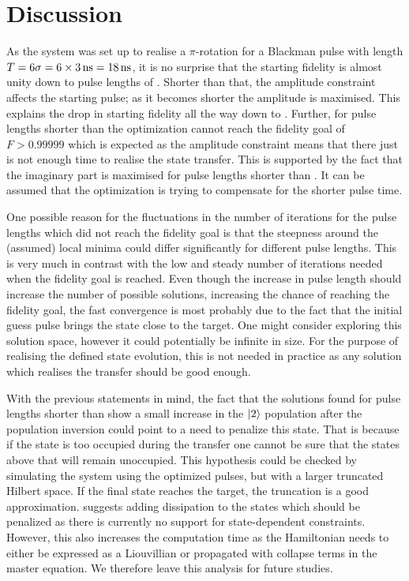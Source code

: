 \documentclass[main.tex]{subfiles}
\begin{document}
\section{Discussion}
As the system was set up to realise a \(\pi\)-rotation for a Blackman pulse with length \(T=6\sigma = 6\times\SI{3}{\nano\second} = \SI{18}{\nano\second}\), it is no surprise that the starting fidelity is almost unity down to pulse lengths of .
Shorter than that, the amplitude constraint affects the starting pulse; as it becomes shorter the amplitude is maximised.
This explains the drop in starting fidelity all the way down to .
Further, for pulse lengths shorter than  the optimization cannot reach the fidelity goal of \(F > 0.99999\) which is expected as the amplitude constraint means that there just is not enough time to realise the state transfer.
This is supported by the fact that the imaginary part is maximised for pulse lengths shorter than .
It can be assumed that the optimization is trying to compensate for the shorter pulse time.

One possible reason for the fluctuations in the number of iterations for the pulse lengths which did not reach the fidelity goal is that the steepness around the (assumed) local minima could differ significantly for different pulse lengths.
This is very much in contrast with the low and steady number of iterations needed when the fidelity goal is reached.
Even though the increase in pulse length should increase the number of possible solutions, increasing the chance of reaching the fidelity goal, the fast convergence is most probably due to the fact that the initial guess pulse brings the state close to the target.
One might consider exploring this solution space, however it could potentially be infinite in size.
For the purpose of realising the defined state evolution, this is not needed in practice as any solution which realises the transfer should be good enough.

With the previous statements in mind, the fact that the solutions found for pulse lengths shorter than  show a small increase in the \(\ket{2}\) population after the population inversion could point to a need to penalize this state.
That is because if the state is too occupied during the transfer one cannot be sure that the states above that will remain unoccupied.
This hypothesis could be checked by simulating the system using the optimized pulses, but with a larger truncated Hilbert space.
If the final state reaches the target, the truncation is a good approximation.
\krotov{} suggests adding dissipation to the states which should be penalized as there is currently no support for state-dependent constraints.
However, this also increases the computation time as the Hamiltonian needs to either be expressed as a Liouvillian or propagated with collapse terms in the master equation.
We therefore leave this analysis for future studies.
\end{document}
